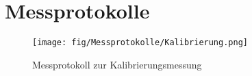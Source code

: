 \section{Messprotokolle}

\begin{figure}[h!]
 \centering
 \texttt{[image: fig/Messprotokolle/Kalibrierung.png]}
 \caption{Messprotokoll zur Kalibrierungsmessung}
 \label{fig:MPKalibrierung}
\end{figure}


